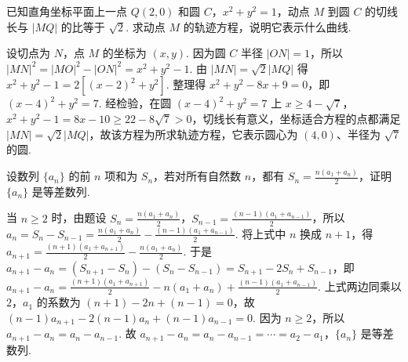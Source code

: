 \documentclass[UTF8,a4paper,oneside,11pt]{ctexbook}
\begin{document}
\begin{problem}
已知直角坐标平面上一点 \(Q(2,0)\) 和圆 \(C\)，\(x^{2}+y^{2}=1\)，动点 \(M\) 到圆 \(C\) 的切线长与 \(|MQ|\) 的比等于 \(\sqrt{2}\). 求动点 \(M\) 的轨迹方程，说明它表示什么曲线.
\end{problem}

\begin{solution}
设切点为 \(N\)，点 \(M\) 的坐标为 \((x,y)\). 因为圆 \(C\) 半径 \(|ON|=1\)，所以 \(|MN|^{2}=|MO|^{2}-|ON|^{2}=x^{2}+y^{2}-1\). 由 \(|MN|=\sqrt{2}|MQ|\) 得 \(x^{2}+y^{2}-1=2\left[\left(x-2\right)^{2}+y^{2}\right]\). 整理得 \(x^{2}+y^{2}-8x+9=0\)，即 \(\left(x-4\right)^{2}+y^{2}=7\). 经检验，在圆 \(\left(x-4\right)^{2}+y^{2}=7\) 上 \(x\geqslant 4-\sqrt{7}\)，\(x^{2}+y^{2}-1=8x-10\geqslant 22-8\sqrt{7}>0\)，切线长有意义，坐标适合方程的点都满足 \(|MN|=\sqrt{2}|MQ|\)，故该方程为所求轨迹方程，它表示圆心为 \((4,0)\)、半径为 \(\sqrt{7}\) 的圆.
\end{solution}

\begin{problem}
设数列 \(\{a_{n}\}\) 的前 \(n\) 项和为 \(S_{n}\)，若对所有自然数 \(n\)，都有 \(S_{n}=\frac{n\left(a_{1}+a_{n}\right)}{2}\)，证明 \(\{a_{n}\}\) 是等差数列.
\end{problem}

\begin{solution}
当 \(n\geqslant 2\) 时，由题设 \(S_{n}=\frac{n\left(a_{1}+a_{n}\right)}{2}\)，\(S_{n-1}=\frac{\left(n-1\right)\left(a_{1}+a_{n-1}\right)}{2}\)，所以 \(a_{n}=S_{n}-S_{n-1}=\frac{n\left(a_{1}+a_{n}\right)}{2}-\frac{\left(n-1\right)\left(a_{1}+a_{n-1}\right)}{2}\). 将上式中 \(n\) 换成 \(n+1\)，得 \(a_{n+1}=\frac{\left(n+1\right)\left(a_{1}+a_{n+1}\right)}{2}-\frac{n\left(a_{1}+a_{n}\right)}{2}\). 于是 \(a_{n+1}-a_{n}=\left(S_{n+1}-S_{n}\right)-\left(S_{n}-S_{n-1}\right)=S_{n+1}-2S_{n}+S_{n-1}\)，即 \(a_{n+1}-a_{n}=\frac{\left(n+1\right)\left(a_{1}+a_{n+1}\right)}{2}-n\left(a_{1}+a_{n}\right)+\frac{\left(n-1\right)\left(a_{1}+a_{n-1}\right)}{2}\). 上式两边同乘以 \(2\)，\(a_{1}\) 的系数为 \(\left(n+1\right)-2n+\left(n-1\right)=0\)，故 \(\left(n-1\right)a_{n+1}-2\left(n-1\right)a_{n}+\left(n-1\right)a_{n-1}=0\). 因为 \(n\geqslant 2\)，所以 \(a_{n+1}-a_{n}=a_{n}-a_{n-1}\). 故 \(a_{n+1}-a_{n}=a_{n}-a_{n-1}=\cdots=a_{2}-a_{1}\)，\(\{a_{n}\}\) 是等差数列.
\end{solution}

\end{document}
